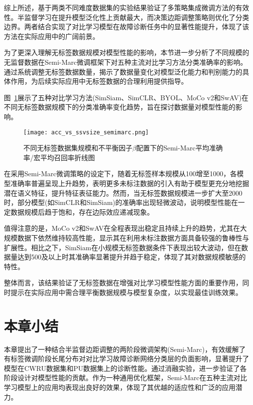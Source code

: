 \documentclass[master]{thesis-uestc}
\begin{document}
综上所述，基于两类不同难度数据集的实验结果验证了多策略集成微调方法的有效性。半监督学习在提升模型泛化性上贡献最大，而决策边距调整策略则优化了分类边界。两者结合实现了对比学习模型在故障诊断任务中的显著性能提升，体现了该方法在实际应用中的广阔前景。

为了更深入理解无标签数据规模对模型性能的影响，本节进一步分析了不同规模的无监督数据在Semi-Marc微调框架下对五种主流对比学习方法分类准确率的影响。通过系统调整无标签数据数量，揭示了数据量变化对模型泛化能力和判别能力的具体作用，为后续实际应用中无标签数据的合理利用提供指导。

图~\ref{acc_vs_ssvsize_semimarc}展示了五种对比学习方法(SimSiam、SimCLR、BYOL、MoCo v2和SwAV)在不同无标签数据规模下的分类准确率变化趋势，旨在探讨数据量对模型性能的影响。

\begin{figure}[H]
    \centering
    \texttt{[image: acc\_vs\_ssvsize\_semimarc.png]}
    \caption{不同无标签数据集规模和不平衡因子$\beta$配置下的Semi-Marc平均准确率/宏平均召回率折线图}
    \label{acc_vs_ssvsize_semimarc}
\end{figure}


在采用Semi-Marc微调策略的设定下，随着无标签样本规模从100增至1000，各模型准确率普遍呈现上升趋势，表明更多未标注数据的引入有助于模型更充分地挖掘潜在语义特征，提升特征表征能力。然而，当无标签数据规模进一步扩大至2000时，部分模型(如SimCLR和SimSiam)的准确率出现轻微波动，说明模型性能在一定数据规模后趋于饱和，存在边际效应递减现象。

值得注意的是，MoCo v2和SwAV在全程表现出稳定且持续上升的趋势，尤其在大规模数据下依然维持较高性能，显示其在利用未标注数据方面具备较强的鲁棒性与扩展性。相比之下，SimSiam在小规模无标签数据条件下表现出较大波动，但在数据量达到500及以上时其准确率显著提升并趋于稳定，体现了其对数据规模敏感的特性。

整体而言，该结果验证了无标签数据在增强对比学习模型性能方面的重要作用，同时提示在实际应用中需合理平衡数据规模与模型复杂度，以实现最佳训练效果。

\FloatBarrier  %
\section{本章小结}
本章提出了一种结合半监督边距调整的两阶段微调架构(Semi-Marc)，有效缓解了有标签微调阶段长尾分布对对比学习故障诊断网络分类层的负面影响，显著提升了模型在CWRU数据集和PU数据集上的诊断性能。通过消融实验，进一步验证了各阶段设计对模型性能的贡献。作为一种通用优化框架，Semi-Marc在五种主流对比学习模型上的应用均表现出良好的效果，体现了其优越的适应性和广泛的应用潜力。
\end{document}
